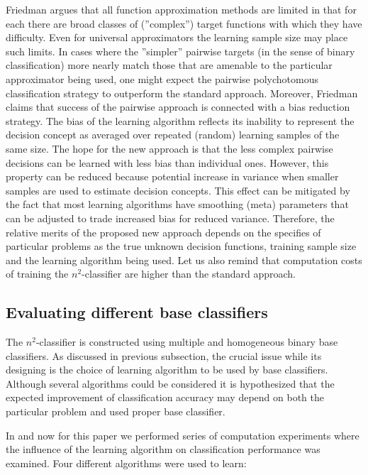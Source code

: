 \documentclass{article}
\begin{document}
Friedman argues \cite{Friedman} that all function approximation methods are
limited in that for each there are broad classes of (''complex'') target
functions with which they have difficulty. Even for universal approximators
the learning sample size may place such limits. In cases where the
''simpler'' pairwise targets (in the sense of binary classification) more
nearly match those that are amenable to the particular approximator being
used, one might expect the pairwise polychotomous classification strategy to
outperform the standard approach. Moreover, Friedman claims that success of
the pairwise approach is connected with a bias reduction strategy. The bias
of the learning algorithm reflects its inability to represent the decision
concept as averaged over repeated (random) learning samples of the same
size. The hope for the new approach is that the less complex pairwise
decisions can be learned with less bias than individual ones. However, this
property can be reduced because potential increase in variance when smaller
samples are used to estimate decision concepts. This effect can be mitigated
by the fact that most learning algorithms have smoothing (meta) parameters
that can be adjusted to trade increased bias for reduced variance.
Therefore, the relative merits of the proposed new approach depends on the
specifies of particular problems as the true unknown decision functions,
training sample size and the learning algorithm being used. Let us also
remind that computation costs of training the $n^{2}$-classifier are higher
than the standard approach.

\subsection{Evaluating different base classifiers}

The $n^{2}$-classifier is constructed using multiple and homogeneous binary
base classifiers. As discussed in previous subsection, the crucial issue
while its designing is the choice of learning algorithm to be used by base
classifiers. Although several algorithms could be considered it is
hypothesized that the expected improvement of classification accuracy may
depend on both the particular problem and used proper base classifier.

In \cite{JelStef97,JelStef98} and now for this paper we performed series of
computation experiments where the influence of the learning algorithm on
classification performance was examined. Four different algorithms were used
to learn:
\end{document}

